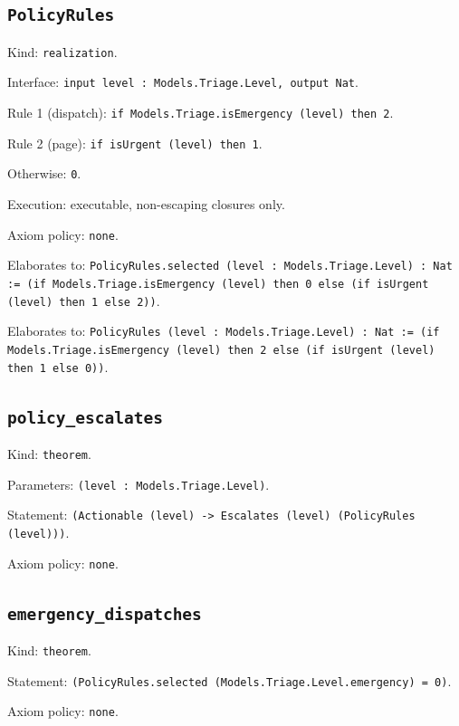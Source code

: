 \documentclass[11pt]{article}
\begin{document}
\subsection*{\texttt{PolicyRules}}
\noindent Kind: \texttt{realization}.\par
\noindent Interface: \texttt{input level : Models.Triage.Level, output Nat}.\par
\noindent Rule 1 (dispatch): \texttt{if Models.Triage.isEmergency (level) then 2}.\par
\noindent Rule 2 (page): \texttt{if isUrgent (level) then 1}.\par
\noindent Otherwise: \texttt{0}.\par
\noindent Execution: executable, non-escaping closures only.\par
\noindent Axiom policy: \texttt{none}.\par
\noindent Elaborates to: \texttt{PolicyRules.selected (level : Models.Triage.Level) : Nat := (if Models.Triage.isEmergency (level) then 0 else (if isUrgent (level) then 1 else 2))}.\par
\noindent Elaborates to: \texttt{PolicyRules (level : Models.Triage.Level) : Nat := (if Models.Triage.isEmergency (level) then 2 else (if isUrgent (level) then 1 else 0))}.\par
\subsection*{\texttt{policy\_escalates}}
\noindent Kind: \texttt{theorem}.\par
\noindent Parameters: \texttt{(level : Models.Triage.Level)}.\par
\noindent Statement: \texttt{(Actionable (level) -> Escalates (level) (PolicyRules (level)))}.\par
\noindent Axiom policy: \texttt{none}.\par
\subsection*{\texttt{emergency\_dispatches}}
\noindent Kind: \texttt{theorem}.\par
\noindent Statement: \texttt{(PolicyRules.selected (Models.Triage.Level.emergency) = 0)}.\par
\noindent Axiom policy: \texttt{none}.\par
\end{document}
